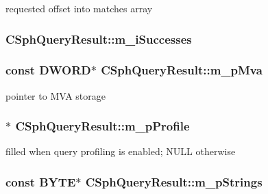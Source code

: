 requested offset into matches array \hypertarget{classCSphQueryResult_af75b01f74d175b7ae2ffd200e1347bf1}{
\subsubsection[{m\-\_\-i\-Successes}]{ C\-Sph\-Query\-Result\-::m\-\_\-i\-Successes}}\label{classCSphQueryResult_af75b01f74d175b7ae2ffd200e1347bf1}
\hypertarget{classCSphQueryResult_aba6a0fd625b2379cebed04c18bf13d22}{
\subsubsection[{m\-\_\-p\-Mva}]{\setlength{\rightskip}{0pt plus 5cm}const {\bf D\-W\-O\-R\-D}$\ast$ C\-Sph\-Query\-Result\-::m\-\_\-p\-Mva}}\label{classCSphQueryResult_aba6a0fd625b2379cebed04c18bf13d22}


pointer to M\-V\-A storage 

\hypertarget{classCSphQueryResult_a35c2e07f1aec77d4aecfc655647a32bc}{
\subsubsection[{m\-\_\-p\-Profile}]{$\ast$ C\-Sph\-Query\-Result\-::m\-\_\-p\-Profile}}\label{classCSphQueryResult_a35c2e07f1aec77d4aecfc655647a32bc}


filled when query profiling is enabled; N\-U\-L\-L otherwise 

\hypertarget{classCSphQueryResult_a13597176881ff26764c4dc5e1a0af864}{
\subsubsection[{m\-\_\-p\-Strings}]{\setlength{\rightskip}{0pt plus 5cm}const {\bf B\-Y\-T\-E}$\ast$ C\-Sph\-Query\-Result\-::m\-\_\-p\-Strings}}\label{classCSphQueryResult_a13597176881ff26764c4dc5e1a0af864}


